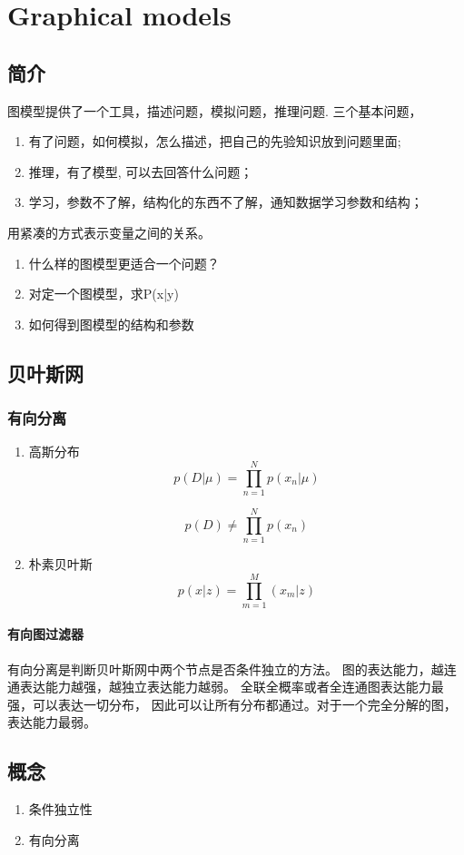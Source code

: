 \chapter{Graphical models}
\section{简介}
图模型提供了一个工具，描述问题，模拟问题，推理问题\cite{longxing2012machinelearning}.
三个基本问题，
\begin{enumerate}
\item 有了问题，如何模拟，怎么描述，把自己的先验知识放到问题里面; 
\item 推理，有了模型, 可以去回答什么问题；
\item 学习，参数不了解，结构化的东西不了解，通知数据学习参数和结构；
\end{enumerate}
用紧凑的方式表示变量之间的关系。
\begin{enumerate}
\item 什么样的图模型更适合一个问题？
\item 对定一个图模型，求P(x|y)
\item 如何得到图模型的结构和参数
\end{enumerate}

\section{贝叶斯网}
\subsection{有向分离}
\begin{enumerate}
\item 高斯分布
\begin{equation}
p(D|\mu) = \prod_{n=1}^Np(x_n|\mu)
\end{equation}

\begin{equation}
p(D) \neq \prod_{n=1}^Np(x_n)
\end{equation}

\item 朴素贝叶斯
\begin{equation}
p(x|z) = \prod_{m=1}^M(x_m|z)
\end{equation}
\end{enumerate}

\subsubsection{有向图过滤器}
有向分离是判断贝叶斯网中两个节点是否条件独立的方法。
图的表达能力，越连通表达能力越强，越独立表达能力越弱。
全联全概率或者全连通图表达能力最强，可以表达一切分布，
因此可以让所有分布都通过。对于一个完全分解的图，表达能力最弱。
\section{概念}
\begin{enumerate}
\item 条件独立性
\item 有向分离
\end{enumerate}
